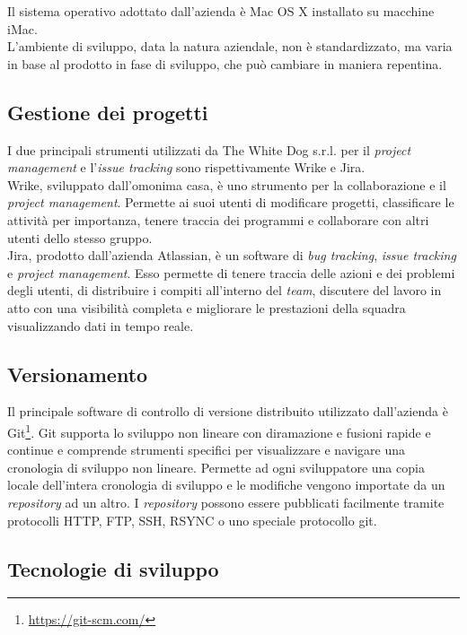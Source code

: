 Il sistema operativo adottato dall'azienda è Mac OS X installato su macchine iMac. \\
L'ambiente di sviluppo, data la natura aziendale, non è standardizzato, ma varia in base al prodotto in fase di sviluppo, che può cambiare in maniera repentina. 

\subsection{Gestione dei progetti}

I due principali strumenti utilizzati da The White Dog s.r.l. per il \textit{project management} e l'\textit{issue tracking} sono rispettivamente Wrike e Jira.\\
Wrike, sviluppato dall'omonima casa, è uno strumento per la collaborazione e il \textit{project management}. Permette ai suoi utenti di modificare progetti, classificare le attività per importanza, tenere traccia dei programmi e collaborare con altri utenti dello stesso gruppo.\\
Jira, prodotto dall'azienda Atlassian, è un software di \textit{bug tracking}, \textit{issue tracking} e \textit{project management}. Esso permette di tenere traccia delle azioni e dei problemi degli utenti, di distribuire i compiti all'interno del \textit{team}, discutere del lavoro in atto con una visibilità completa e migliorare le prestazioni della squadra visualizzando dati in tempo reale.

\subsection{Versionamento}

Il principale software di controllo di versione distribuito utilizzato dall'azienda è Git\footnote[6]{\url{https://git-scm.com/}}. Git supporta lo sviluppo non lineare con diramazione e fusioni rapide e continue e comprende strumenti specifici per visualizzare e navigare una cronologia di sviluppo non lineare. Permette ad ogni sviluppatore una copia locale dell'intera cronologia di sviluppo e le modifiche vengono importate da un \textit{repository} ad un altro. I \textit{repository} possono essere pubblicati facilmente tramite protocolli HTTP, FTP, SSH, RSYNC o uno speciale protocollo git.

\subsection{Tecnologie di sviluppo}

